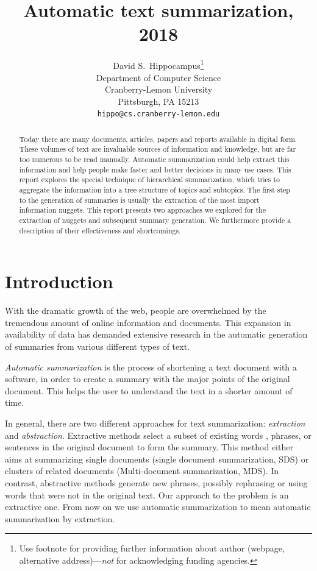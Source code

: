 \documentclass{article}
\title{Automatic text summarization, 2018}
\author{
  David S.~Hippocampus\thanks{Use footnote for providing further
    information about author (webpage, alternative
    address)---\emph{not} for acknowledging funding agencies.} \\
  Department of Computer Science\\
  Cranberry-Lemon University\\
  Pittsburgh, PA 15213 \\
  \texttt{hippo@cs.cranberry-lemon.edu} \\
}
\begin{document}

\maketitle


\begin{abstract}
  Today there are many documents, articles, papers and reports available in digital form. These volumes of text are invaluable sources of information and knowledge, but are far too numerous to be read manually. Automatic summarization could help extract this information and help people make faster and better decisions in many use cases. This report explores the special technique of hierarchical summarization, which tries to aggregate the information into a tree structure of topics and subtopics. The first step to the generation of summaries is usually the extraction of the most import information nuggets. This report presents two approaches we explored for the extraction of nuggets and subsequent summary generation. We furthermore provide a description of their effectiveness and shortcomings. 
  
\end{abstract}

\section{Introduction}

\label{sec:intro}

With the dramatic growth of the web, people are overwhelmed by the tremendous amount of online information and documents. This expansion in availability of data has demanded extensive research in the automatic generation of summaries from various different types of text.

\textit{Automatic summarization} is the process of shortening a text document with a software, in order to create a summary with the major points of the original document. This helps the user to understand the text in a shorter amount of time.	     

In general, there  are two different approaches for text summarization: \textit{extraction} and \textit{abstraction}. Extractive methods select a subset of existing words , phrases, or sentences in the original document to form the summary. This method either aims at summarizing single documents (single document summarization, SDS) or clusters of related documents (Multi-document summarization, MDS). In contrast, abstractive methods generate new phrases, possibly rephrasing or using words that were not in the original text. Our approach to the problem is an extractive one. From now on we use automatic summarization to mean automatic summarization by extraction. 
\end{document}
